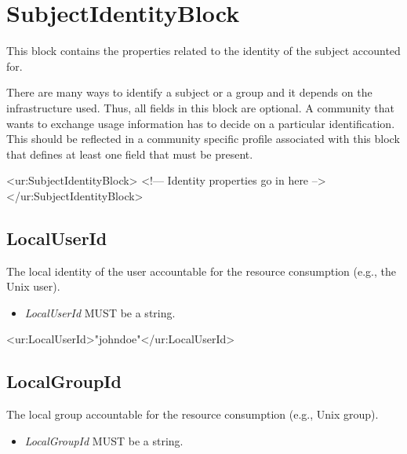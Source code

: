 
\section{SubjectIdentityBlock}

This block contains the properties related to the identity of the subject accounted for. 

There are many ways to identify a subject or a group and it depends on the infrastructure used. Thus, all fields in this block are optional. 
A community that wants to exchange usage information has to decide 
on a particular identification.
This should be reflected in a community specific profile associated with this block that defines at least one field that must be present.

\begin{XMLexample}
<ur:SubjectIdentityBlock>
<!— Identity properties go in here -->
</ur:SubjectIdentityBlock> 
\end{XMLexample}






\subsection{LocalUserId}

The local identity of the user accountable for the resource consumption (e.g., the Unix user).
\begin{itemize}
\item \emph{LocalUserId} MUST be a string.
\end{itemize}

\begin{XMLexample}
<ur:LocalUserId>"johndoe"</ur:LocalUserId> 
\end{XMLexample}






\subsection{LocalGroupId}

The local group accountable for the resource consumption (e.g., Unix group).
\begin{itemize}
\item \emph{LocalGroupId} MUST be a string.
\end{itemize}

